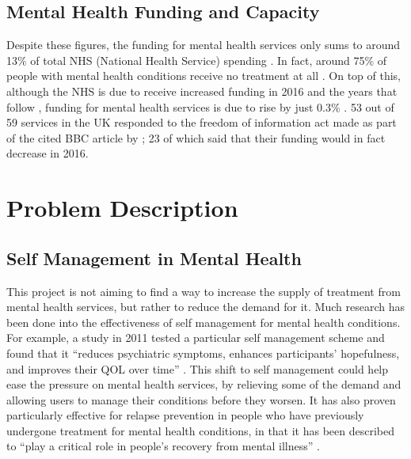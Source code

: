 \documentclass[11pt,openright,a4paper]{report}
\begin{document}
\subsection{Mental Health Funding and Capacity}
Despite these figures, the funding for mental health services only sums to around 13\% of total NHS (National Health Service) spending \parencite{cepnhsfunding}. In fact, around 75\% of people with mental health conditions receive no treatment at all \parencite{cmoreport2013}. On top of this, although the NHS is due to receive increased funding in 2016 and the years that follow \parencite{kfnhsbudget}, funding for mental health services is due to rise by just 0.3\% \parencite{mhfunding}. 53 out of 59 services in the UK responded to the freedom of information act made as part of the cited BBC article by \citeauthor{mhfunding}; 23 of which said that their funding would in fact decrease in 2016.

\section{Problem Description}
\subsection{Self Management in Mental Health}
This project is not aiming to find a way to increase the supply of treatment from mental health services, but rather to reduce the demand for it. Much research has been done into the effectiveness of self management for mental health conditions. For example, a study in 2011 tested a particular self management scheme and found that it \enquote{reduces psychiatric symptoms, enhances participants’ hopefulness, and improves their QOL over time} \parencite{wrapstudy}. This shift to self management could help ease the pressure on mental health services, by relieving some of the demand and allowing users to manage their conditions before they worsen. It has also proven particularly effective for relapse prevention in people who have previously undergone treatment for mental health conditions, in that it has been described to \enquote{play a critical role in people's recovery from mental illness} \parencite{selfmanagementrelapse}.
\end{document}
